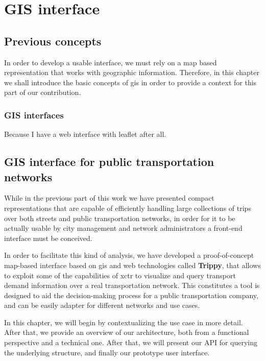 \part{GIS interface}
\chapter{Previous concepts}
    In order to develop a usable interface, we must rely on a map based representation that works with geographic information. Therefore, in this chapter we shall introduce the basic concepts of \gls{gis} in order to provide a context for this part of our contribution.

    \section{GIS interfaces}
	Because I have a web interface with leaflet after all.

\chapter{GIS interface for public transportation networks}
\label{sec:gis}
	While in the previous part of this work we have presented compact representations that are capable of efficiently handling large collections of trips over both streets and public transportation networks, in order for it to be actually usable by city management and network administrators a front-end interface must be conceived.
	
	In order to facilitate this kind of analysis, we have developed a proof-of-concept map-based interface based on \gls{gis} and web technologies called \textbf{Trippy}, that allows to exploit some of the capabilities of \gls{xctr} to visualize and query transport demand information over a real transportation network. This constitutes a tool is designed to aid the decision-making process for a public transportation company, and can be easily adapter for different networks and use cases.
	
	In this chapter, we will begin by contextualizing the use case in more detail. After that, we provide an overview of our architecture, both from a functional perspective and a technical one. After that, we will present our API for querying the underlying structure, and finally our prototype user interface.
	
